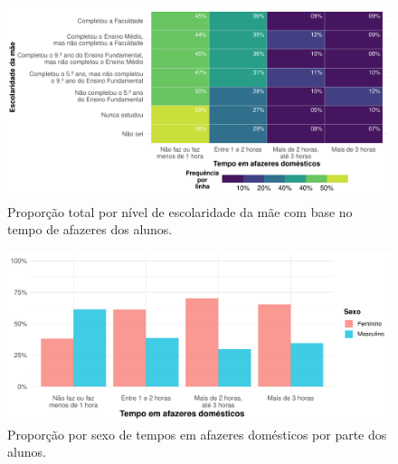 \newpage
\begin{figure}[h]
    \caption{Proporção total por nível de escolaridade da mãe
    com base no tempo de afazeres dos alunos.\label{esc_mae_afazeres}}
    \begin{center}
        \includegraphics[width=16cm]{img/esc_mae_afazeres.pdf}
    \end{center}
\end{figure}

\begin{figure}[h]
    \caption{Proporção por sexo de tempos em afazeres domésticos por parte
    dos alunos.\label{sexo_afazeres}}
    \begin{center}
        \includegraphics[width=16cm]{img/sexo_afazeres.pdf}
    \end{center}
\end{figure}


